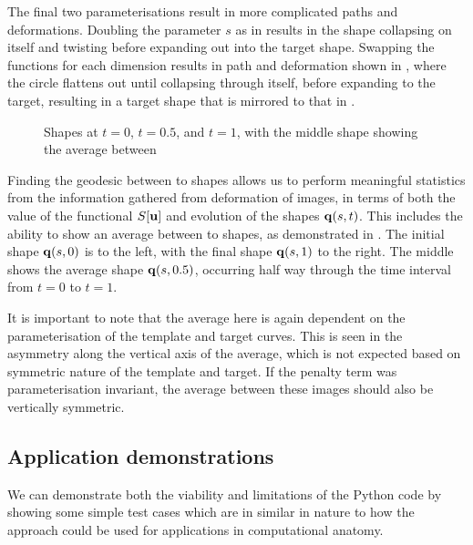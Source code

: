 \documentclass[a4paper, 12pt]{article}
\begin{document}
The final two parameterisations result in more complicated paths and
deformations. Doubling the parameter $s$ as in  results in the shape
collapsing on itself and twisting before expanding out into the target
shape. Swapping the functions for each dimension results in path and deformation
shown in , where the circle flattens out until collapsing through itself, before
expanding to the target, resulting in a target shape that is mirrored to that in
.

\begin{figure}[h!]
  \centering
  \caption{Shapes at $t=0$, $t=0.5$, and $t=1$, with the middle shape
    showing the average between}
\label{fig:average}
\end{figure}

Finding the geodesic between to shapes allows us to perform meaningful statistics from the
information gathered from deformation of images, in terms of both the value of
the functional $S[\mathbf{u}]$ and evolution of the shapes $\mathbf{q}(s,t)$. This
includes the ability to show an average between to shapes, as
demonstrated in . The initial shape $\mathbf{q}(s,0)$ is to the left,
with the final shape $\mathbf{q}(s,1)$ to the right. The middle shows the average
shape $\mathbf{q}(s,0.5)$, occurring half way through the time interval from $t=0$
to $t=1$. 

It is important to note that the average here is again dependent on
the parameterisation of the template and target curves. This is seen in the
asymmetry along the vertical axis of the average, which is not expected based on
symmetric nature of the template and target. If the penalty term was
parameterisation invariant, the average between these images should also be
vertically symmetric.


\subsection{Application demonstrations}

We can demonstrate both the viability and limitations of the Python code
by showing some simple test cases which are in similar in nature to how the
approach could be used for applications in computational anatomy.
\end{document}
